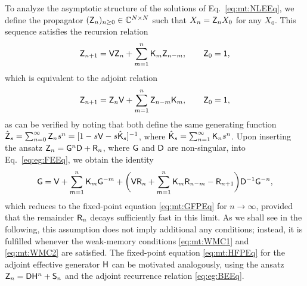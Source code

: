 \documentclass[aps,prl,reprint]{revtex4-2}
\begin{document}
To analyze the asymptotic structure of the solutions of Eq.~\eqref{eq:mt:NLEEq}, we define the propagator $(\mathsf{Z}_n)_{n\geq 0}\in\mathbb{C}^{N\times N}$ such that $X_n = \mathsf{Z}_n X_0$ for any $X_0$.
This sequence satisfies the recursion relation
\begin{equation}\label{eq:eg:FEEq}
\mathsf{Z}_{n+1} = \mathsf{V}\mathsf{Z}_n + \sum_{m=1}^n\mathsf{K}_m\mathsf{Z}_{n-m}, \qquad
\mathsf{Z}_0 = \mathsf{1},
\end{equation}
which is equivalent to the adjoint relation
\begin{equation}\label{eq:eg:BEEq}
\mathsf{Z}_{n+1} = \mathsf{Z}_n\mathsf{V} + \sum_{m=1}^n\mathsf{Z}_{n-m}\mathsf{K}_m, \qquad
\mathsf{Z}_0 = \mathsf{1},
\end{equation}
as can be verified by noting that both define the same generating function $\hat{\mathsf{Z}}_s = \sum_{n=0}^\infty \mathsf{Z}_n s^n=[1-s\mathsf{V} -s\hat{\mathsf{K}}_s]^{-1}$, where $\hat{\mathsf{K}}_s=\sum_{n=1}^\infty\mathsf{K}_n s^n$.
Upon inserting the ansatz $\mathsf{Z}_n = \mathsf{G}^n\mathsf{D} + \mathsf{R}_n$, where $\mathsf{G}$ and $\mathsf{D}$ are non-singular, into Eq.~\eqref{eq:eg:FEEq}, we obtain the identity
\begin{equation}
\mathsf{G} = \mathsf{V} + \sum_{m=1}^n \mathsf{K}_m \mathsf{G}^{-m} +
\biggl(\mathsf{V}\mathsf{R}_n + \sum_{m=1}^n\mathsf{K}_m\mathsf{R}_{n-m} - \mathsf{R}_{n+1}\biggr)\mathsf{D}^{-1}\mathsf{G}^{-n},
\end{equation}
which reduces to the fixed-point equation \eqref{eq:mt:GFPEq} for $n\rightarrow\infty$, provided that the remainder $\mathsf{R}_n$ decays sufficiently fast in this limit.
As we shall see in the following, this assumption does not imply additional any conditions; instead, it is fulfilled whenever the weak-memory conditions \eqref{eq:mt:WMC1} and \eqref{eq:mt:WMC2} are satisfied.
The fixed-point equation \eqref{eq:mt:HFPEq} for the adjoint effective generator $\mathsf{H}$ can be motivated analogously, using the ansatz $\mathsf{Z}_n = \mathsf{D}\mathsf{H}^n + \mathsf{S}_n$ and the adjoint recurrence relation \eqref{eq:eg:BEEq}.
\end{document}
